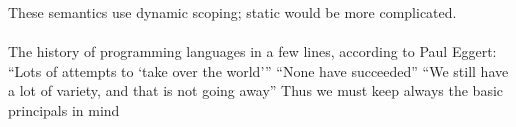 \documentclass[../../lecture_notes.tex]{subfiles}
\begin{document}
\noindent These semantics use dynamic scoping; static would be more complicated.\\
\\
The history of programming languages in a few lines, according to Paul Eggert:
	\indent “Lots of attempts to ‘take over the world’”
	\indent “None have succeeded”
	\indent “We still have a lot of variety, and that is not going away”
	Thus we must keep always the basic principals in mind
\end{document}
